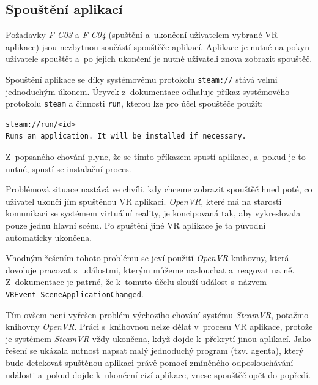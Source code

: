 \subsection{Spouštění
aplikací}\label{spouux161tux11bnuxed-aplikacuxed}

Požadavky \emph{F-C03} a \emph{F-C04} (spuštění a~ukončení uživatelem
vybrané VR aplikace) jsou nezbytnou součástí spouštěče
aplikací. Aplikace je nutné na pokyn uživatele spouštět a~po jejich ukončení 
je nutné uživateli znova zobrazit spouštěč.

Spouštění aplikace se díky systémovému protokolu \texttt{steam://} stává
velmi jednoduchým úkonem. Úryvek z~dokumentace \autocite{protocoldocs} odhaluje příkaz
systémového protokolu \texttt{steam} a činnosti \texttt{run}, kterou lze
pro účel spouštěče použít:

\begin{verbatim}
steam://run/<id>
Runs an application. It will be installed if necessary.
\end{verbatim}

Z~popsaného chování plyne, že se tímto příkazem spustí aplikace, a~pokud je
to nutné, spustí se instalační proces. 

Problémová situace nastává ve
chvíli, kdy chceme zobrazit spouštěč hned poté, co uživatel
ukončí jím spuštěnou VR aplikaci. \emph{OpenVR}, které má na starosti
komunikaci se systémem virtuální reality, je koncipovaná tak, 
aby vykreslovala pouze jednu hlavní scénu. Po spuštění jiné VR aplikace 
je ta původní automaticky ukončena.

Vhodným řešením tohoto problému se jeví použití \emph{OpenVR} knihovny, která
dovoluje pracovat s~událostmi, kterým můžeme naslouchat a~reagovat na
ně. Z~dokumentace \autocite{openvrdocs} je patrné, že k~tomuto účelu slouží událost s~názvem
\texttt{VREvent\_SceneApplicationChanged}. 

Tím ovšem není vyřešen
problém výchozího chování systému \emph{SteamVR}, potažmo knihovny
\emph{OpenVR}. Práci s~knihovnou nelze dělat v~procesu VR aplikace,
protože je systémem \emph{SteamVR} vždy ukončena, když dojde
k~překrytí jinou aplikací. Jako řešení se ukázala nutnost napsat malý 
jednoduchý program (tzv. agenta), který bude detekovat spuštěnou aplikaci právě
pomocí zmíněného odposlouchávání události a~pokud dojde k~ukončení cizí 
aplikace, vnese spouštěč opět do popředí.

